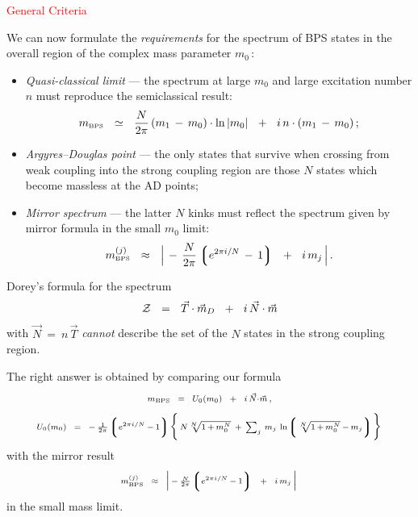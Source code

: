 \documentclass[12pt,letterpaper,landscape,KOMA,smallheadings,calcdimensions,display]{powersem}
\newcommand{\mbps}{m_{\text{\tiny BPS}}}
\begin{document}
\begin{slide}

\centerline{\Large\textcolor{red}{General Criteria}}

\small
	We can now formulate the {\it requirements} for the spectrum of BPS states in the overall
	region of the complex mass parameter $ m_0 \,$:
\begin{itemize}
\item
	\emph{Quasi-classical limit} --- the spectrum at large $ m_0 $ and large excitation number $ n $
	must reproduce the semiclassical result:
\[
\mbps ~~\simeq~~ \frac{N}{2\pi}\,
		( m_1 \,-\, m_0 ) \cdot \ln |m_0 |
	    ~~+~~
	i\, n \cdot ( m_1 \,-\, m_0 )\,;
\]

\item
	\emph{Argyres--Douglas point} --- the only states that survive when crossing from weak coupling 
	into the strong coupling region are those $ N $ states which become massless at the AD points;

\item
	\emph{Mirror spectrum} --- the latter $ N $ kinks must reflect the spectrum given by mirror 
	formula in the small $ m_0 $ limit:
\[
	\mbps^{(j)} ~~\approx~~ \Big|\, -\, \frac{N}{2\pi} \lgr e^{2\pi i / N} \,-\, 1 \rgr 
			   ~~+~~ i\, m_j \,\Big|\,\text.
\]

\end{itemize}


\end{slide}


\begin{slide}

	Dorey's formula for the spectrum
\[
	\mathcal{Z} ~~=~~ \vec{T} \cdot \vec{m}{}_D ~~+~~ i\, \vec{N} \cdot \vec{m}
\]
	with $ \vec{N} ~=~ n\, \vec{T} $
	\emph{cannot} describe the set of the $ N $ states in the strong coupling region.

	The right answer is obtained by comparing our formula 
\[
\scriptstyle
	\mbps ~~=~~ U_0 (m_0) ~~+~~ i\, \vec{N} \cdot \vec{m}\,,
\]
\[
\scriptstyle
	U_0 (m_0) ~~=~~ -\, \frac{1}{2\pi} \left\lgroup e^{2\pi i / N} \,-\, 1 \right\rgroup 
	\biggl\{\, N \sqrt[N] { 1 \,+\, m_0^N }  ~+~ 
	\sum_j\, m_j\, \ln  \left\lgroup \sqrt[N] {1 \,+\,  m_0^N } \,-\, m_j \right\rgroup  \biggr\}\,
\]
	with the mirror result
\[
\scriptstyle
	\mbps^{(j)} ~~\approx~~ \Big|\, -\, \frac{N}{2\pi} \lgr e^{2\pi i / N} \,-\, 1 \rgr 
			   ~~+~~ i\, m_j \,\Big|\,
\]
	in the small mass limit. 

\end{slide}
\end{document}
